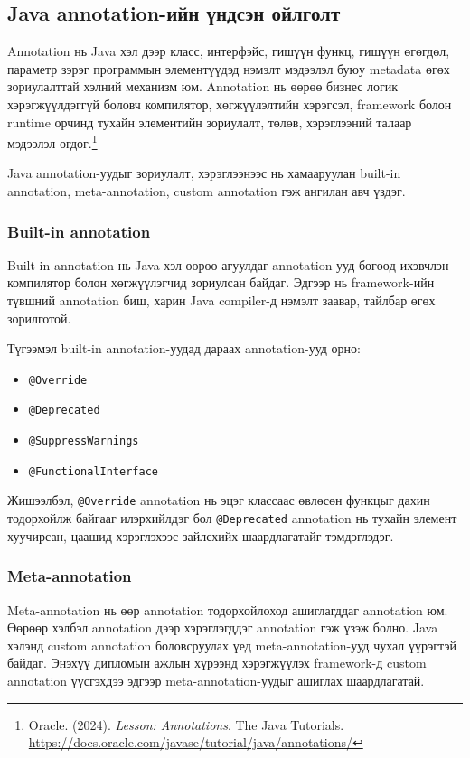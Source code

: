 
\subsection{Java annotation-ийн үндсэн ойлголт}

Annotation нь Java хэл дээр класс, интерфэйс, гишүүн функц, гишүүн өгөгдөл, параметр зэрэг программын элементүүдэд нэмэлт мэдээлэл буюу metadata өгөх зориулалттай хэлний механизм юм. Annotation нь өөрөө бизнес логик хэрэгжүүлдэггүй боловч компилятор, хөгжүүлэлтийн хэрэгсэл, framework болон runtime орчинд тухайн элементийн зориулалт, төлөв, хэрэглээний талаар мэдээлэл өгдөг.\footnote{Oracle. (2024).
\textit{Lesson: Annotations}.
The Java\texttrademark{} Tutorials.
\url{https://docs.oracle.com/javase/tutorial/java/annotations/}}

Java annotation-уудыг зориулалт, хэрэглээнээс нь хамааруулан built-in annotation, meta-annotation, custom annotation гэж ангилан авч үздэг.

\subsubsection{Built-in annotation}

Built-in annotation нь Java хэл өөрөө агуулдаг annotation-ууд бөгөөд ихэвчлэн компилятор болон хөгжүүлэгчид зориулсан байдаг. Эдгээр нь framework-ийн түвшний annotation биш, харин Java compiler-д нэмэлт заавар, тайлбар өгөх зорилготой.

Түгээмэл built-in annotation-уудад дараах annotation-ууд орно:
\begin{itemize}
    \item \texttt{@Override}
    \item \texttt{@Deprecated}
    \item \texttt{@SuppressWarnings}
    \item \texttt{@FunctionalInterface}
\end{itemize}

Жишээлбэл, \texttt{@Override} annotation нь эцэг классаас өвлөсөн функцыг дахин тодорхойлж байгааг илэрхийлдэг бол \texttt{@Deprecated} annotation нь тухайн элемент хуучирсан, цаашид хэрэглэхээс зайлсхийх шаардлагатайг тэмдэглэдэг.

\subsubsection{Meta-annotation}

Meta-annotation нь өөр annotation тодорхойлоход ашиглагддаг annotation юм. Өөрөөр хэлбэл annotation дээр хэрэглэгддэг annotation гэж үзэж болно. Java хэлэнд custom annotation боловсруулах үед meta-annotation-ууд чухал үүрэгтэй байдаг. Энэхүү дипломын ажлын хүрээнд хэрэгжүүлэх framework-д custom annotation үүсгэхдээ эдгээр meta-annotation-уудыг ашиглах шаардлагатай.

